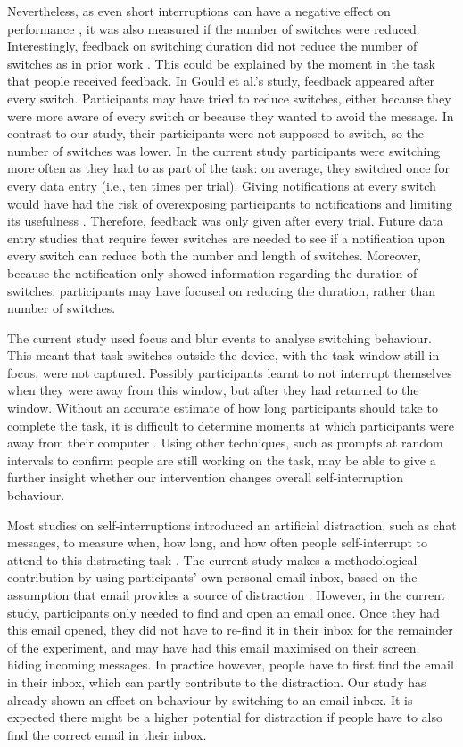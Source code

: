 Nevertheless, as even short interruptions can have a negative effect on performance \citep{Altmann2014}, it was also measured if the number of switches were reduced. Interestingly, feedback on switching duration did not reduce the number of switches as in prior work \citep{Gould2016a}. This could be explained by the moment in the task that people received feedback. In Gould et al.'s study, feedback appeared after every switch. Participants may have tried to reduce switches, either because they were more aware of every switch or because they wanted to avoid the message. In contrast to our study, their participants were not supposed to switch, so the number of switches was lower. In the current study participants were switching more often as they had to as part of the task: on average, they switched once for every data entry (i.e., ten times per trial). Giving notifications at every switch would have had the risk of overexposing participants to notifications and limiting its usefulness \citep{Cutrell2001, Whittaker2016}. Therefore, feedback was only given after every trial. Future data entry studies that require fewer switches are needed to see if a notification upon every switch can reduce both the number and length of switches. Moreover, because the notification only showed information regarding the duration of switches, participants may have focused on reducing the duration, rather than number of switches. 

The current study used focus and blur events to analyse switching behaviour. This meant that task switches outside the device, with the task window still in focus, were not captured. Possibly participants learnt to not interrupt themselves when they were away from this window, but after they had returned to the window. Without an accurate estimate of how long participants should take to complete the task, it is difficult to determine moments at which participants were away from their computer \citep{Rzeszotarski2013}.  Using other techniques, such as prompts at random intervals to confirm people are still working on the task, may be able to give a further insight whether our intervention changes overall self-interruption behaviour. 

Most studies on self-interruptions introduced an artificial distraction, such as chat messages, to measure when, how long, and how often people self-interrupt to attend to this distracting task \citep{Katidioti2013, Salvucci2010}. The current study makes a methodological contribution by using participants' own personal email inbox, based on the assumption that email provides a source of distraction \citep{Hanrahan2015, Mark2016}. However, in the current study, participants only needed to find and open an email once. Once they had this email opened, they did not have to re-find it in their inbox for the remainder of the experiment, and may have had this email maximised on their screen, hiding incoming messages. In practice however, people have to first find the email in their inbox, which can partly contribute to the distraction. Our study has already shown an effect on behaviour by switching to an email inbox. It is expected there might be a higher potential for distraction if people have to also find the correct email in their inbox.

